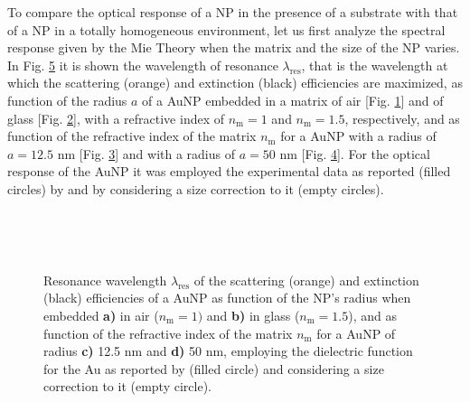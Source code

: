 
To compare the optical response of a NP in the presence of a substrate with that of a NP in a totally homogeneous environment, let us first analyze the spectral response given by the Mie Theory when the matrix and the size of the NP varies. In Fig. \ref{fig:Mie:redshift} it is shown the wavelength
 of resonance $\lambda_\text{res}$, that is the wavelength at which the scattering (orange) and extinction (black) efficiencies are maximized,  as function of the radius $a$ of a AuNP embedded in a matrix of air [Fig. \ref{sfig:red:1}] and of glass [Fig. \ref{sfig:red:2}], with a refractive index of $n_\text{m} = 1$ and $n_\text{m} = 1.5$, respectively, and as function of the refractive index of the matrix $n_\text{m}$ for a AuNP with a radius of {$a = 12.5$ nm} [Fig. \ref{sfig:red:3}] and with a radius of $a = 50$ nm [Fig. \ref{sfig:red:4}]. For the optical response of the AuNP it was employed the experimental data as reported (filled circles) by \citeauthor{johnson_optical_1972} \cite{johnson_optical_1972}  and by considering a size correction to it (empty circles).

\begin{figure}[h!] \centering
    \def\svgwidth{.9\textwidth}
    \vspace*{-18.6em} \\
    \hspace*{-5.9em}%
        \begin{subfigure}{.20\textwidth}\caption{ }\label{sfig:red:1}\end{subfigure}%
        \begin{subfigure}{.235\textwidth}\caption{ }\label{sfig:red:2}\end{subfigure}%
        \begin{subfigure}{.20\textwidth}\caption{ }\label{sfig:red:3}\end{subfigure}%
        \begin{subfigure}{.24\textwidth}\caption{ }\label{sfig:red:4}\end{subfigure}
    \vspace*{16.5em}\\
    \caption[Spectral redshift of the scattering and extinction  efficiencies of a spherical AuNP as function of its size and the embedding media]{Resonance wavelength $\lambda_\text{res}$ of the scattering (orange) and extinction (black) efficiencies of a AuNP as function of the NP's radius when embedded \textbf{a)} in air ($n_\text{m} = 1)$ and \textbf{b)} in glass ($n_\text{m} = 1.5$), and as function of the refractive index of the matrix  $n_\text{m}$ for a AuNP of radius \textbf{c)} 12.5 nm and \textbf{d)} 50 nm, employing the dielectric function for the Au as reported by \citeauthor{johnson_optical_1972} (filled circle) and considering a size correction to it (empty circle).}
    \label{fig:Mie:redshift}
\end{figure}

